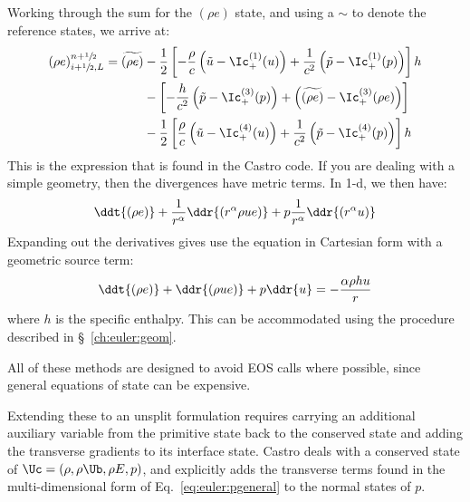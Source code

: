Working through the sum for the $(\rho e)$ state, and using a $\sim$ to
denote the reference states, we arrive at:
\begin{align}
(\rho e)_{i+\myhalf,L}^{n+\myhalf} = \widetilde{(\rho e)} &-
   \frac{1}{2} \left [ -\frac{\rho}{c} \left (\tilde{u} - \Ic^{(1)}_+(u) \right )
                       +\frac{1}{c^2} \left (\tilde{p} - \Ic^{(1)}_+(p) \right )
               \right ] h \nonumber \\
  &-
    \left [ -\frac{h}{c^2} \left (\tilde{p} - \Ic^{(3)}_+(p) \right )
                       + \left (\widetilde{(\rho e)} - \Ic^{(3)}_+(\rho e) \right )
               \right ] \nonumber \\
  &-
   \frac{1}{2} \left [ \frac{\rho}{c} \left (\tilde{u} - \Ic^{(4)}_+(u) \right )
                       +\frac{1}{c^2} \left (\tilde{p} - \Ic^{(4)}_+(p) \right )
               \right ] h
\end{align}
This is the expression that is found in the Castro code.  If you are dealing with
a simple geometry, then the divergences have metric terms.  In 1-d, we then have:
\begin{equation}
 \ddt{(\rho e)} + \frac{1}{r^\alpha} \ddr{(r^\alpha \rho u e)} + p \frac{1}{r^\alpha} \ddr{(r^\alpha u)}
\end{equation}
Expanding out the derivatives gives use the equation in Cartesian form with a geometric source term:
\begin{equation}
 \ddt{(\rho e)} + \ddr{(\rho u e)} + p \ddr{u} = -\frac{\alpha \rho hu}{r}
\end{equation}
where $h$ is the specific enthalpy.  This can be accommodated using
the procedure described in \S~\ref{ch:euler:geom}.

All of these methods are designed to avoid EOS calls where possible,
since general equations of state can be expensive.

Extending these to an unsplit formulation requires carrying an additional
auxiliary variable from the primitive state back to the conserved state
and adding the transverse gradients to its interface state.  Castro
deals with a conserved state of $\Uc = (\rho, \rho \Ub, \rho E, p)$, and
explicitly adds the transverse terms found in the multi-dimensional form
of Eq.~\ref{eq:euler:pgeneral}
to the normal states of $p$.
